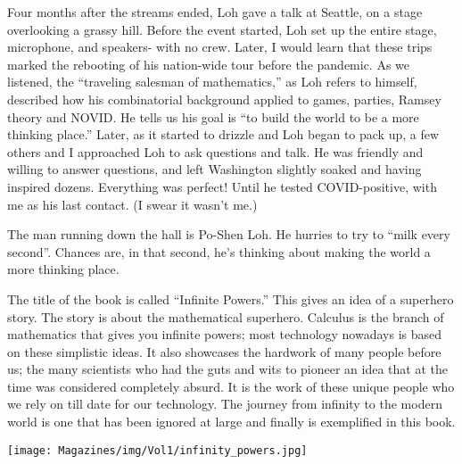 \documentclass{article}
\begin{document}
\begin{multicols}{3}
Four months after the streams ended, Loh gave a talk at Seattle, on a stage overlooking a grassy hill. Before the event started, Loh set up the entire stage, microphone, and speakers- with no crew. Later, I would learn that these trips marked the rebooting of his nation-wide tour before the pandemic. As we listened, the “traveling salesman of mathematics,” as Loh refers to himself, described how his combinatorial background applied to games, parties, Ramsey theory and NOVID. He tells us his goal is “to build the world to be a more thinking place.” Later, as it started to drizzle and Loh began to pack up, a few others and I approached Loh to ask questions and talk. He was friendly and willing to answer questions, and left Washington slightly soaked and having inspired dozens. Everything was perfect! Until he tested COVID-positive, with me as his last contact. (I swear it wasn’t me.)

The man running down the hall is Po-Shen Loh. He hurries to try to “milk every second”. Chances are, in that second, he’s thinking about making the world a more thinking place.
\closearticle


The title of the book is called “Infinite Powers.” This gives an idea of a superhero story. The
story is about the mathematical superhero. Calculus is the branch of mathematics that gives you
infinite powers; most technology nowadays is based on these simplistic ideas. It also showcases
the hardwork of many people before us; the many scientists who had the guts and wits to
pioneer an idea that at the time was considered completely absurd. It is the work of these
unique people who we rely on till date for our technology. The journey from infinity to the modern
world is one that has been ignored at large and finally is exemplified in this book.

\begin{center}
   \texttt{[image: Magazines/img/Vol1/infinity\_powers.jpg]}
\end{center}


\end{multicols}
\end{document}
